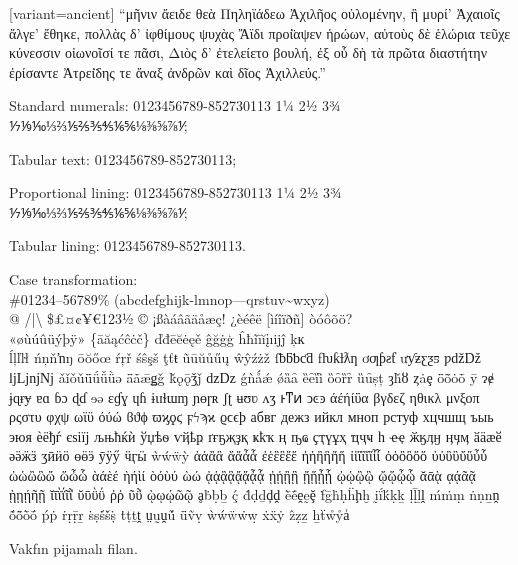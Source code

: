 \documentclass[a4paper,14pt]{memoir}
\begin{document}
{\begin{greek}[variant=ancient]
``μῆνιν ἄειδε θεὰ Πηληϊάδεω Ἀχιλῆος οὐλομένην, ἣ μυρί' Ἀχαιοῖς ἄλγε'
ἔθηκε, πολλὰς δ' ἰφθίμους ψυχὰς Ἄϊδι προί̈αψεν ἡρώων, αὐτοὺς δὲ ἑλώρια
τεῦχε κύνεσσιν οἰωνοῖσί τε πᾶσι, Διὸς δ' ἐτελείετο βουλή, ἐξ οὗ δὴ τὰ
πρῶτα διαστήτην ἐρίσαντε Ἀτρεί̈δης τε ἄναξ ἀνδρῶν καὶ δῖος Ἀχιλλεύς.''
\end{greek}


\medskip
Standard numerals: {0123456789-852730113 1¼ 2½ 3¾ ⅐⅑⅒⅓⅔⅕⅖⅗⅘⅙⅚⅛⅜⅝⅞⅟;}

Tabular text: {0123456789-852730113};

Proportional lining: {0123456789-852730113 1¼ 2½ 3¾ ⅐⅑⅒⅓⅔⅕⅖⅗⅘⅙⅚⅛⅜⅝⅞⅟};

Tabular lining: {0123456789-852730113}.

Case transformation:\\
\#01234--56789\% (abcdefghijk-lmnop---qrstuv\textasciitilde{}wxyz)\\
@ /|\textbackslash{} \$£¤¢¥€123½
© ¡ßàáâãäåæç! ¿èéêë [ìíîïðñ] òóôõö?\\
«øùúûüýþÿ» \{āăąćĉċč\} ďđēĕėęě ĝğġģ ĥħĩīĭįıĳĵ ķĸ\\
ĺļľŀł ńņňŉŋ ōŏőœ ŕŗř śŝşš ţťŧ
ũūŭůűų ŵŷźżž ſƀƃƅƈƌ ƒƕƙƚƛƞ ơƣƥƨƭ ưƴƶƹƺƽ ƿǆǅ ǉǈǌǋ ǎǐǒǔǖǘǚǜǝ ǟǡǣǥǧ ǩǫǭǯǰ ǳǲ
ǵǹǻǽ ǿȁȃ ȅȇȉȋ ȍȏȑȓ ȕȗșț ȝȟȣ ȥȧȩ ȫȭȯȱ ȳ
ɂɇ ɉɋɍɏ ɐɑ ɓɔ ɖɗ ɘə
ɛɠɣ ɥɦ ɨɩɪɫɯɱ ɲɵɼʀ
ʃʈ ʉʊʋ ʌʒ
ͱͳͷ ͻͼͽ
άέήίΰα βγδεζ ηθικλ μνξοπ ρςστυ φχψ ωϊϋ
όύώ ϐϑϕ ϖϗϙϛ ϝϟϡϰ ϱϲϵϸ
абвг дежз ийкл мноп рстуф хцчшщ ъыь эюя
ѐёђѓ єѕіїј љњћќѝ ўџѣѳ ѵҋҍҏ ґғҕҗҙқ ҝҟҡ ң ҧҩ ҫҭүұҳ ҵҷҹ һ ҽҿ ӂӄӆӈ ӊӌӎ ӑӓӕӗ әӛӝӟ ӡӣӥӧ өӫӭ ӯӱӳ ӵӷӹ
ẁẃẅỳ
ἀἁἂἃ ἄἅἆἇ ἐἑἒἓἔἕ ἠἡἢἣἤἥ ἰἱἲἳἴἵἶἷ ὀὁὂὃὄὅ ὐὑὒὓὔὕὖὗ ὠὡὢὣὤ ὥὦὧ ὰάὲέ ὴήὶί ὸόὺύ ὼώ ᾀᾁᾂᾃᾄᾅᾆᾇ ᾐᾑᾒᾓ ᾔᾕᾖᾗ ᾠᾡᾢᾣ ᾤᾥᾦᾧ ᾰᾱᾲ ᾳᾴᾶᾷ
ῂῃῄῆῇ ῐῑῒΐῖῗ ῠῡῢΰ ῤῥ ῦῧ ῲῳῴῶῷ
ḁḃḅḇ ḉ ḋḍḏḑḓ ḕḗḙḛḝ ḟḡḣḥḧḩḫ ḭḯḱḳḵ ḷḹḻḽ ḿṁṃ ṅṇṉṋ ṍṏṑṓ ṕṗ ṙṛṝṟ ṡṣṥṧṩ ṫṭṯṱ ṳṵṷṹ ṻṽṿ ẁẃẅẇẉ ẋẍẏ ẑẓẕ ẖẗẘẙẚ

{Vakfın pijamalı filan.}

}
\end{document}
